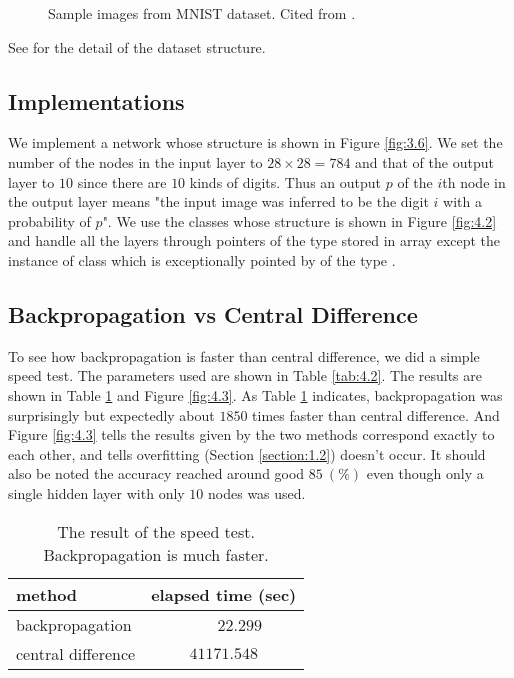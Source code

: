 \documentclass{article}
\theoremstyle{definition}
\newcommand{\sect}[1]{Section \ref{section:#1}}
\newcommand{\fig}[1]{Figure \ref{fig:#1}}
\newcommand{\tab}[1]{Table \ref{tab:#1}}
\begin{document}
\begin{figure}[H]
    \centering
    \begin{subfigure}[H]{1.0\textwidth}
	\end{subfigure}
    \caption{Sample images from MNIST dataset. Cited from \cite{8}.}
    \label{fig:4.1}
\end{figure}

See \href{../read\_mnist/README.md}{} for the detail of the dataset structure.

\subsection{Implementations} \label{section:4.2}

We implement a network whose structure is shown in \fig{3.6}. We set the number of the nodes in the input layer to $28 \times 28 = 784$ and that of the output layer to $10$ since there are $10$ kinds of digits. Thus an output $p$ of the $i$th node in the output layer means "the input image was inferred to be the digit $i$ with a probability of $p$". We use the classes whose structure is shown in \fig{4.2} and handle all the layers through pointers of the type  stored in  array except the instance of  class which is exceptionally pointed by  of the type .

\subsection{Backpropagation vs Central Difference}

To see how backpropagation is faster than central difference, we did a simple speed test. The parameters used are shown in \tab{4.2}. The results are shown in \tab{4.1} and \fig{4.3}. As \tab{4.1} indicates, backpropagation was surprisingly but expectedly about $1850$ times faster than central difference. And \fig{4.3} tells the results given by the two methods correspond exactly to each other, and tells overfitting (\sect{1.2}) doesn't occur. It should also be noted the accuracy reached around good $85\ (\%)$ even though only a single hidden layer with only $10$ nodes was used.

\begin{table}[H]
    \centering
    \begin{tabular}{|l|c|} \hline
    method & elapsed time (sec) \\ \hline
    backpropagation & \ \ \ \ $22.299$ \\ \hline
    central difference & $41171.548$ \\ \hline
    \end{tabular}
    \caption{The result of the speed test. Backpropagation is much faster.}
    \label{tab:4.1}
\end{table}
\end{document}
